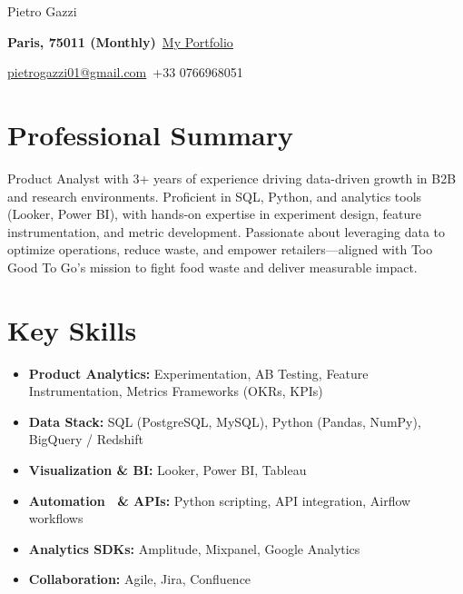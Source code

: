 \documentclass[letterpaper,10.5pt]{article}
\begin{document}
\begin{center}\vspace{-10pt}
{\LARGE Pietro Gazzi}\vspace{-11pt}
\begin{multicols}{2}
\begin{flushleft}
\textbf{Paris, 75011 (Monthly)}\
\href{https://pietrowei.github.io/Portfolio}{\underline{My Portfolio}}
\end{flushleft}
\begin{flushright}
\href{mailto:pietrogazzi01@gmail.com}{pietrogazzi01@gmail.com}\
+33 0766968051
\end{flushright}
\end{multicols}
\end{center}

\section*{Professional Summary}
Product Analyst with 3+ years of experience driving data-driven growth in B2B and research environments. Proficient in SQL, Python, and analytics tools (Looker, Power BI), with hands-on expertise in experiment design, feature instrumentation, and metric development. Passionate about leveraging data to optimize operations, reduce waste, and empower retailers—aligned with Too Good To Go’s mission to fight food waste and deliver measurable impact.

\section*{Key Skills}
\begin{multicols}{2}
\begin{itemize}[leftmargin=0.2in]
\item \textbf{Product Analytics:} Experimentation, AB Testing, Feature Instrumentation, Metrics Frameworks (OKRs, KPIs)
\item \textbf{Data Stack:} SQL (PostgreSQL, MySQL), Python (Pandas, NumPy), BigQuery / Redshift
\item \textbf{Visualization & BI:} Looker, Power BI, Tableau
\item \textbf{Automation \ & APIs:} Python scripting, API integration, Airflow workflows
\item \textbf{Analytics SDKs:} Amplitude, Mixpanel, Google Analytics
\item \textbf{Collaboration:} Agile, Jira, Confluence
\end{itemize}
\end{multicols}
\end{document}
